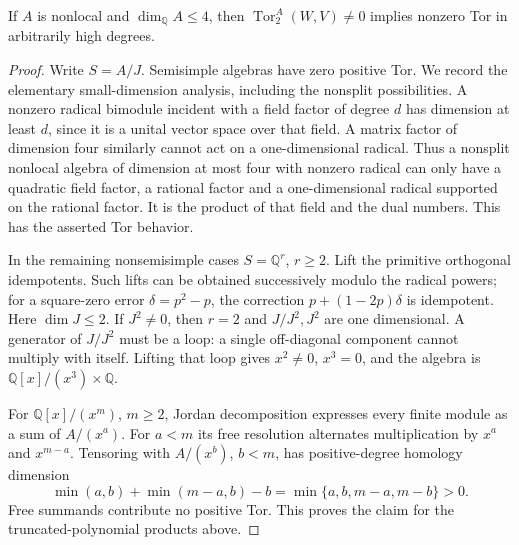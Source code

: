 \begin{lemma}
\label{A:nonlocal-four}
If $A$ is nonlocal and $\dim_{\mathbb Q}A\leq4$, then
$\operatorname{Tor}_2^A(W,V)\ne0$ implies nonzero Tor in
arbitrarily high degrees.
\end{lemma}
\begin{proof}
Write $S=A/J$. Semisimple algebras have zero positive Tor.
We record the elementary small-dimension analysis, including
the nonsplit possibilities. A nonzero radical bimodule
incident with a field factor of degree $d$ has dimension at
least $d$, since it is a unital vector space over that field.
A matrix factor of dimension four similarly cannot act on
a one-dimensional radical. Thus a nonsplit nonlocal algebra
of dimension at most four with nonzero radical can only have
a quadratic field factor, a rational factor and a
one-dimensional radical supported on the rational factor.
It is the product of that field and the dual numbers.
This has the asserted Tor behavior.

In the remaining nonsemisimple cases $S=\mathbb Q^r$,
$r\geq2$. Lift the primitive orthogonal idempotents. Such
lifts can be obtained successively modulo the radical powers;
for a square-zero error $\delta=p^2-p$, the correction
$p+(1-2p)\delta$ is idempotent. Here $\dim J\leq2$.
If $J^2\ne0$, then $r=2$ and $J/J^2,J^2$ are
one dimensional. A generator of $J/J^2$ must be a loop:
a single off-diagonal component cannot multiply with itself.
Lifting that loop gives $x^2\ne0$, $x^3=0$, and the algebra
is $\mathbb Q[x]/(x^3)\times\mathbb Q$.

For $\mathbb Q[x]/(x^m)$, $m\geq2$, Jordan decomposition
expresses every finite module as a sum of $A/(x^a)$.
For $a<m$ its free resolution alternates multiplication by
$x^a$ and $x^{m-a}$. Tensoring with $A/(x^b)$, $b<m$,
has positive-degree homology dimension
\[
 \min(a,b)+\min(m-a,b)-b
 =\min\{a,b,m-a,m-b\}>0.
\]
Free summands contribute no positive Tor. This proves the
claim for the truncated-polynomial products above.


\end{proof}
